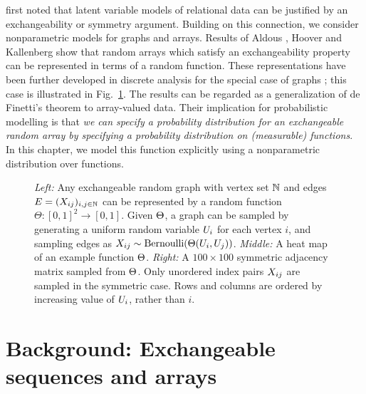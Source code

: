 \citet{Hoff2007a} first noted that latent variable models of relational data can be justified by an exchangeability or symmetry argument.
Building on this connection, we consider nonparametric models for graphs and arrays.
Results of
Aldous \cite{Aldous:1981}, Hoover \cite{Hoover:1979} and Kallenberg \cite{Kallenberg:1992} show
that random arrays which satisfy an exchangeability property can be represented in terms of a random
function. These representations have been further developed in discrete analysis for the
special case of graphs \citep{Lovasz:Szegedy:2006}; this case is illustrated in Fig.~\ref{fig:W:graph}.
The results can be regarded as a generalization of de Finetti's theorem to array-valued data.
Their implication for probabilistic modelling is that
\emph{we can specify a probability distribution for an exchangeable random array by specifying a probability distribution on (measurable) functions}.
In this chapter, we model this function explicitly using a nonparametric distribution over functions.

\begin{figure}
 \begin{center}
    
  \end{center}
 \caption{\emph{Left:} Any exchangeable random graph with vertex set $\mathbb{N}$ and edges ${E=(X_{ij})_{i,j\in\mathbb{N}}}$ can be represented
   by a random function ${\Theta:[0,1]^2\rightarrow[0,1]}$. Given $\Theta$, a graph can be sampled by generating a uniform random 
   variable $U_i$ for each vertex $i$, and sampling edges as ${X_{ij}\sim\mbox{\rm Bernoulli}(\Theta(U_i,U_j))}$.
   \emph{Middle:} A heat map of an example function $\Theta$.
   \emph{Right:} A ${100\times 100}$ symmetric adjacency matrix sampled from $\Theta$.
   Only unordered index pairs $X_{ij}$ are sampled in the symmetric case. Rows and columns are ordered
   by increasing value of $U_i$, rather than $i$.}
 \label{fig:W:graph}
\end{figure}


\section{Background: Exchangeable sequences and arrays}
\label{sec:background}

